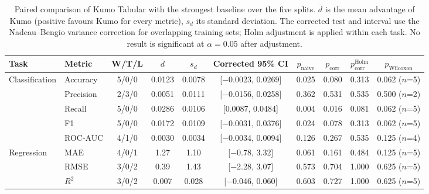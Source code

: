\begin{table}[t]
\centering
\caption{Paired comparison of Kumo Tabular with the strongest baseline over the five splits. $\overline{d}$ is the mean advantage of Kumo (positive favours Kumo for every metric), $s_d$ its standard deviation. The corrected test and interval use the Nadeau--Bengio variance correction for overlapping training sets; Holm adjustment is applied within each task. No result is significant at $\alpha=0.05$ after adjustment.}
\label{tab:paired}
\setlength{\tabcolsep}{4.5pt}
\smallskip
\begin{adjustbox}{max width=\textwidth}
\begin{tabular}{llcccccccc}
\toprule
Task & Metric & W/T/L & $\overline{d}$ & $s_d$ & Corrected 95\% CI & $p_{\mathrm{naive}}$ & $p_{\mathrm{corr}}$ & $p_{\mathrm{corr}}^{\mathrm{Holm}}$ & $p_{\mathrm{Wilcoxon}}$ \\
\midrule
Classification & Accuracy & 5/0/0 & 0.0123 & 0.0078 & [$-$0.0023, 0.0269] & 0.025 & 0.080 & 0.313 & 0.062 ($n$=5) \\
 & Precision & 2/3/0 & 0.0051 & 0.0111 & [$-$0.0156, 0.0258] & 0.362 & 0.531 & 0.535 & 0.500 ($n$=2) \\
 & Recall & 5/0/0 & 0.0286 & 0.0106 & [0.0087, 0.0484] & 0.004 & 0.016 & 0.081 & 0.062 ($n$=5) \\
 & F1 & 5/0/0 & 0.0172 & 0.0109 & [$-$0.0031, 0.0376] & 0.024 & 0.078 & 0.313 & 0.062 ($n$=5) \\
 & ROC-AUC & 4/1/0 & 0.0030 & 0.0034 & [$-$0.0034, 0.0094] & 0.126 & 0.267 & 0.535 & 0.125 ($n$=4) \\
\midrule
Regression & MAE & 4/0/1 & 1.27 & 1.10 & [$-$0.78, 3.32] & 0.061 & 0.161 & 0.484 & 0.125 ($n$=5) \\
 & RMSE & 3/0/2 & 0.39 & 1.43 & [$-$2.28, 3.07] & 0.573 & 0.704 & 1.000 & 0.625 ($n$=5) \\
 & $R^2$ & 3/0/2 & 0.007 & 0.028 & [$-$0.046, 0.060] & 0.603 & 0.727 & 1.000 & 0.625 ($n$=5) \\
\bottomrule
\end{tabular}
\end{adjustbox}
\end{table}
